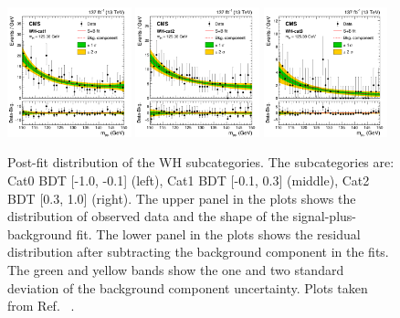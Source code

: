 \begin{figure}[!htb]
  \centering
  \captionsetup{justification=justified}
  \includegraphics[width=0.32\textwidth]{pics/VH_sec/VH_results/postfit_WH_cat1.png}
  \includegraphics[width=0.32\textwidth]{pics/VH_sec/VH_results/postfit_WH_cat2.png}
  \includegraphics[width=0.32\textwidth]{pics/VH_sec/VH_results/postfit_WH_cat3.png}
  \caption{Post-fit \mmm distribution of the WH subcategories. The subcategories are: Cat0 BDT [-1.0, -0.1] (left), Cat1 BDT [-0.1, 0.3] (middle), Cat2 BDT [0.3, 1.0] (right). 
           The upper panel in the plots shows the distribution of observed data and the shape of the signal-plus-background fit.
           The lower panel in the plots shows the residual distribution after subtracting the background component in the fits.
           The green and yellow bands show the one and two standard deviation of the background component uncertainty.
           Plots taken from Ref. ~\cite{Sirunyan_2021}.}
  \label{fig:wh_postfit}
\end{figure}

